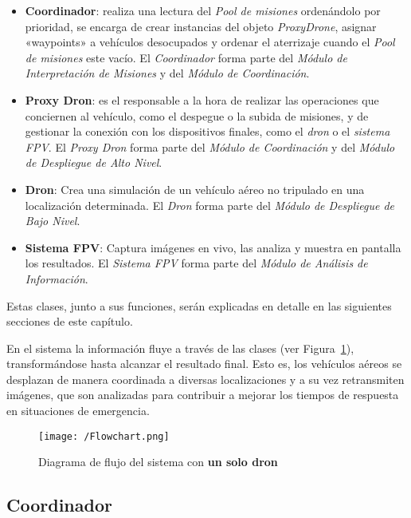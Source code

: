 \begin{itemize}
\item \textbf{Coordinador}: realiza una lectura del \textit{Pool de misiones} ordenándolo por prioridad, se encarga de crear instancias del objeto \textit{ProxyDrone}, asignar «waypoints» a vehículos desocupados y ordenar el aterrizaje cuando el \textit{Pool de misiones} este vacío. El \textit{Coordinador} forma parte del \textit{Módulo de Interpretación de Misiones} y del \textit{Módulo de Coordinación}.
\item \textbf{Proxy Dron}: es el responsable a la hora de realizar las operaciones que conciernen al vehículo, como el despegue o la subida de misiones, y de gestionar la conexión con los dispositivos finales, como el \textit{dron} o el \textit{sistema \acs{FPV}}. El \textit{Proxy Dron} forma parte del \textit{Módulo de Coordinación} y del \textit{Módulo de Despliegue de Alto Nivel}.
\item \textbf{Dron}: Crea una simulación de un vehículo aéreo no tripulado en una localización determinada. El \textit{Dron} forma parte del \textit{Módulo de Despliegue de Bajo Nivel}.
\item \textbf{Sistema \acs{FPV}}: Captura imágenes en vivo, las analiza y muestra en pantalla los resultados. El \textit{Sistema \acs{FPV}} forma parte del \textit{Módulo de Análisis de Información}.
\end{itemize}

Estas clases, junto a sus funciones, serán explicadas en detalle en las siguientes secciones de este capítulo. 

En el sistema la información fluye a través de las clases (ver Figura~\ref{fig:diagflujo}), transformándose hasta alcanzar el resultado final. Esto es, los vehículos aéreos se desplazan de manera coordinada a diversas localizaciones y a su vez retransmiten imágenes, que son analizadas para contribuir a mejorar los tiempos de respuesta en situaciones de emergencia.

\begin{figure}[!h]
\begin{center}
\texttt{[image: /Flowchart.png]}
\caption[Diagrama de flujo del sistema con un solo dron]{Diagrama de flujo del sistema con \textbf{un solo dron}}
\label{fig:diagflujo}
\end{center}
\end{figure}

\clearpage

\subsection{Coordinador}
\label{sec:coordinador}

